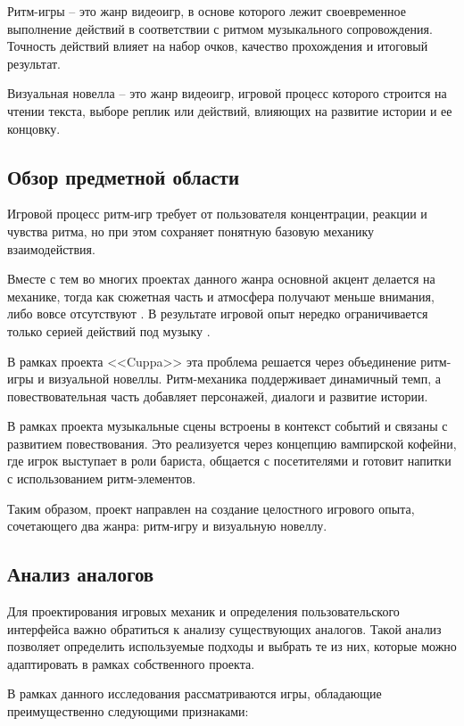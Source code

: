 \documentclass[utf8, russian]{eskdtext}
\numberwithin{equation}{section}
\begin{document}
Ритм-игры -- это жанр видеоигр, в основе которого лежит своевременное выполнение действий в соответствии с ритмом музыкального сопровождения. Точность действий влияет на набор очков, качество прохождения и итоговый результат.

Визуальная новелла -- это жанр видеоигр, игровой процесс которого строится на чтении текста, выборе реплик или действий, влияющих на развитие истории и ее концовку.

\subsection{Обзор предметной области}

Игровой процесс ритм-игр требует от пользователя концентрации, реакции и чувства ритма, но при этом сохраняет понятную базовую механику взаимодействия.

Вместе с тем во многих проектах данного жанра основной акцент делается на механике, тогда как сюжетная часть и атмосфера получают меньше внимания, либо вовсе отсутствуют \cite{osuabout}\cite{stepmaniafaq}\cite{guitarhero}. В результате игровой опыт нередко ограничивается только серией действий под музыку \cite{osuabout}\cite{stepmaniafaq}\cite{guitarhero}.

В рамках проекта <<Cuppa>> эта проблема решается через объединение ритм-игры и визуальной новеллы. Ритм-механика поддерживает динамичный темп, а повествовательная часть добавляет персонажей, диалоги и развитие истории.

В рамках проекта музыкальные сцены встроены в контекст событий и связаны с развитием повествования. Это реализуется через концепцию вампирской кофейни, где игрок выступает в роли бариста, общается с посетителями и готовит напитки с использованием ритм-элементов.

Таким образом, проект направлен на создание целостного игрового опыта, сочетающего два жанра: ритм-игру и визуальную новеллу.

\subsection{Анализ аналогов}

Для проектирования игровых механик и определения пользовательского интерфейса важно обратиться к анализу существующих аналогов. Такой анализ позволяет определить используемые подходы и выбрать те из них, которые можно адаптировать в рамках собственного проекта.

В рамках данного исследования рассматриваются игры, обладающие преимущественно следующими признаками:
\end{document}
